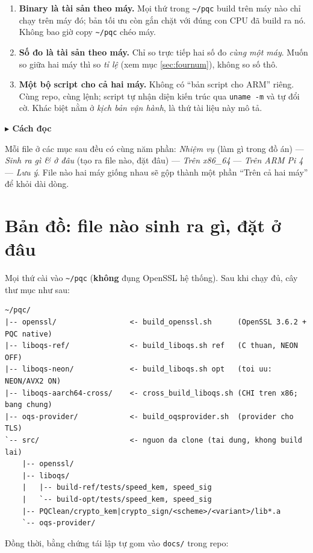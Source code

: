 \documentclass[11pt,a4paper]{article}
\newcommand{\tip}[1]{\par\smallskip\noindent\textcolor{accent}{\textbf{\small$\blacktriangleright$ #1}}\par}
\begin{document}
\begin{enumerate}[leftmargin=1.6em,topsep=2pt]
  \item \textbf{Binary là tài sản theo máy.} Mọi thứ trong \verb|~/pqc| build trên máy nào chỉ chạy trên máy đó; bản tối ưu còn gắn chặt với đúng con CPU đã build ra nó. Không bao giờ copy \verb|~/pqc| chéo máy.
  \item \textbf{Số đo là tài sản theo máy.} Chỉ so trực tiếp hai số đo \emph{cùng một máy}. Muốn so giữa hai máy thì so \emph{tỉ lệ} (xem mục \ref{sec:fournum}), không so số thô.
  \item \textbf{Một bộ script cho cả hai máy.} Không có ``bản script cho ARM'' riêng. Cùng repo, cùng lệnh; script tự nhận diện kiến trúc qua \verb|uname -m| và tự đổi cờ. Khác biệt nằm ở \emph{kịch bản vận hành}, là thứ tài liệu này mô tả.
\end{enumerate}

\tip{Cách đọc} Mỗi file ở các mục sau đều có cùng năm phần: \emph{Nhiệm vụ} (làm gì trong đồ án) — \emph{Sinh ra gì \& ở đâu} (tạo ra file nào, đặt đâu) — \emph{Trên x86\_64} — \emph{Trên ARM Pi 4} — \emph{Lưu ý}. File nào hai máy giống nhau sẽ gộp thành một phần ``Trên cả hai máy'' để khỏi dài dòng.

\section{Bản đồ: file nào sinh ra gì, đặt ở đâu}

Mọi thứ cài vào \verb|~/pqc| (\textbf{không} đụng OpenSSL hệ thống). Sau khi chạy đủ, cây thư mục như sau:

\begin{lstlisting}
~/pqc/
|-- openssl/                 <- build_openssl.sh      (OpenSSL 3.6.2 + PQC native)
|-- liboqs-ref/              <- build_liboqs.sh ref   (C thuan, NEON OFF)
|-- liboqs-neon/             <- build_liboqs.sh opt   (toi uu: NEON/AVX2 ON)
|-- liboqs-aarch64-cross/    <- cross_build_liboqs.sh (CHI tren x86; bang chung)
|-- oqs-provider/            <- build_oqsprovider.sh  (provider cho TLS)
`-- src/                     <- nguon da clone (tai dung, khong build lai)
    |-- openssl/
    |-- liboqs/
    |   |-- build-ref/tests/speed_kem, speed_sig
    |   `-- build-opt/tests/speed_kem, speed_sig
    |-- PQClean/crypto_kem|crypto_sign/<scheme>/<variant>/lib*.a
    `-- oqs-provider/
\end{lstlisting}

Đồng thời, bằng chứng tái lập tự gom vào \verb|docs/| trong repo:
\end{document}
